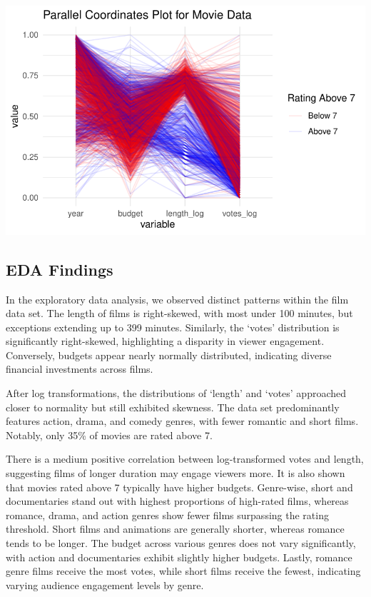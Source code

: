 \documentclass[
  11pt,
]{article}
\begin{document}
\includegraphics{Group_07_Analysis_files/figure-pdf/unnamed-chunk-20-1.pdf}

\hypertarget{eda-findings}{%
\subsection{EDA Findings}\label{eda-findings}}

In the exploratory data analysis, we observed distinct patterns within
the film data set. The length of films is right-skewed, with most under
100 minutes, but exceptions extending up to 399 minutes. Similarly, the
`votes' distribution is significantly right-skewed, highlighting a
disparity in viewer engagement. Conversely, budgets appear nearly
normally distributed, indicating diverse financial investments across
films.

After log transformations, the distributions of `length' and `votes'
approached closer to normality but still exhibited skewness. The data
set predominantly features action, drama, and comedy genres, with fewer
romantic and short films. Notably, only 35\% of movies are rated above
7.

There is a medium positive correlation between log-transformed votes and
length, suggesting films of longer duration may engage viewers more. It
is also shown that movies rated above 7 typically have higher budgets.
Genre-wise, short and documentaries stand out with highest proportions
of high-rated films, whereas romance, drama, and action genres show
fewer films surpassing the rating threshold. Short films and animations
are generally shorter, whereas romance tends to be longer. The budget
across various genres does not vary significantly, with action and
documentaries exhibit slightly higher budgets. Lastly, romance genre
films receive the most votes, while short films receive the fewest,
indicating varying audience engagement levels by genre.
\end{document}
